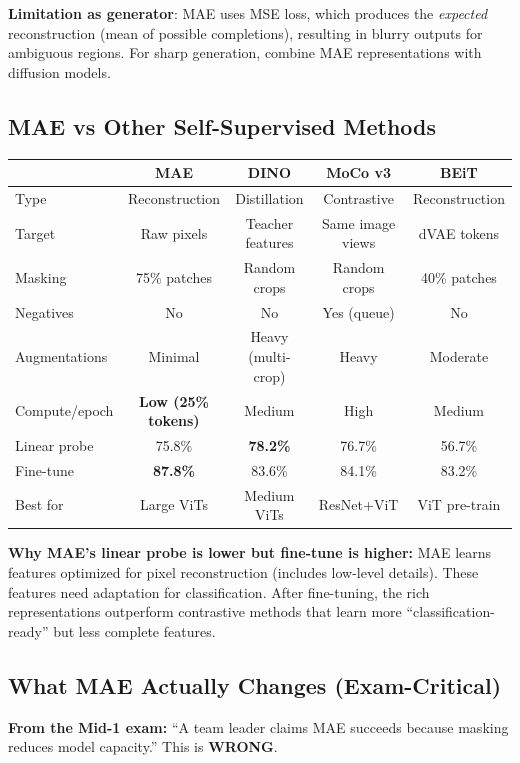 \textbf{Limitation as generator}: MAE uses MSE loss, which produces the \emph{expected} reconstruction (mean of possible completions), resulting in blurry outputs for ambiguous regions. For sharp generation, combine MAE representations with diffusion models.

\subsection{MAE vs Other Self-Supervised Methods}

\begin{center}\small
\begin{tabular}{lcccc}\toprule
& \textbf{MAE} & \textbf{DINO} & \textbf{MoCo v3} & \textbf{BEiT} \\\midrule
Type & Reconstruction & Distillation & Contrastive & Reconstruction \\
Target & Raw pixels & Teacher features & Same image views & dVAE tokens \\
Masking & 75\% patches & Random crops & Random crops & 40\% patches \\
Negatives & No & No & Yes (queue) & No \\
Augmentations & Minimal & Heavy (multi-crop) & Heavy & Moderate \\
Compute/epoch & \textbf{Low (25\% tokens)} & Medium & High & Medium \\
Linear probe & 75.8\% & \textbf{78.2\%} & 76.7\% & 56.7\% \\
Fine-tune & \textbf{87.8\%} & 83.6\% & 84.1\% & 83.2\% \\
Best for & Large ViTs & Medium ViTs & ResNet+ViT & ViT pre-train \\
\bottomrule
\end{tabular}
\end{center}

\textbf{Why MAE's linear probe is lower but fine-tune is higher:} MAE learns features optimized for pixel reconstruction (includes low-level details). These features need adaptation for classification. After fine-tuning, the rich representations outperform contrastive methods that learn more ``classification-ready'' but less complete features.

\subsection{What MAE Actually Changes (Exam-Critical)}

\textbf{From the Mid-1 exam:} ``A team leader claims MAE succeeds because masking reduces model capacity.'' This is \textbf{WRONG}.


